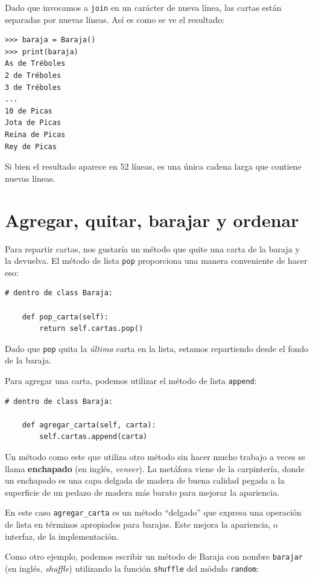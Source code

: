 \documentclass[10pt]{book}
\begin{document}
Dado que invocamos a {\tt join} en un carácter de nueva línea, las cartas
están separadas por nuevas líneas.  Así es como se ve el resultado:

\begin{verbatim}
>>> baraja = Baraja()
>>> print(baraja)
As de Tréboles
2 de Tréboles
3 de Tréboles
...
10 de Picas
Jota de Picas
Reina de Picas
Rey de Picas
\end{verbatim}
%
Si bien el resultado aparece en 52 líneas, es una única
cadena larga que contiene nuevas líneas.


\section{Agregar, quitar, barajar y ordenar}

Para repartir cartas, nos gustaría un método que
quite una carta de la baraja y la devuelva.
El método de lista {\tt pop} proporciona una manera conveniente de hacer eso:

\begin{verbatim}
# dentro de class Baraja:

    def pop_carta(self):
        return self.cartas.pop()
\end{verbatim}
%
Dado que {\tt pop} quita la {\em última} carta en la lista, estamos
repartiendo desde el fondo de la baraja.

Para agregar una carta, podemos utilizar el método de lista {\tt append}:

\begin{verbatim}
# dentro de class Baraja:

    def agregar_carta(self, carta):
        self.cartas.append(carta)
\end{verbatim}
%
Un método como este que utiliza otro método sin hacer
mucho trabajo a veces se llama {\bf enchapado} (en inglés, {\em veneer}).  La metáfora
viene de la carpintería, donde un enchapado es una capa
delgada de madera de buena calidad pegada a la superficie de un pedazo de madera
más barato para mejorar la apariencia.

En este caso \verb"agregar_carta" es un método ``delgado'' que expresa
una operación de lista en términos apropiados para barajas.  Este
mejora la apariencia, o interfaz, de la
implementación.

Como otro ejemplo, podemos escribir un método de Baraja con nombre {\tt barajar} (en inglés, {\em shuffle})
utilizando la función {\tt shuffle} del módulo {\tt random}:
\end{document}
